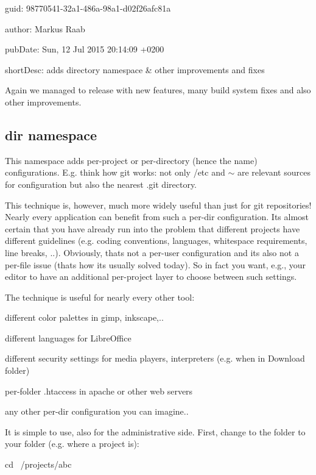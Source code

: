 
\begin{DoxyItemize}
\item guid\+: 98770541-\/32a1-\/486a-\/98a1-\/d02f26afc81a
\item author\+: Markus Raab
\item pub\+Date\+: Sun, 12 Jul 2015 20\+:14\+:09 +0200
\item short\+Desc\+: adds directory namespace \& other improvements and fixes
\end{DoxyItemize}

Again we managed to release with new features, many build system fixes and also other improvements.

\subsection*{dir namespace}

This namespace adds per-\/project or per-\/directory (hence the name) configurations. E.\+g. think how git works\+: not only /etc and $\sim$ are relevant sources for configuration but also the nearest .git directory.

This technique is, however, much more widely useful than just for git repositories! Nearly every application can benefit from such a per-\/dir configuration. Its almost certain that you have already run into the problem that different projects have different guidelines (e.\+g. coding conventions, languages, whitespace requirements, line breaks, ..). Obviously, thats not a per-\/user configuration and its also not a per-\/file issue (thats how its usually solved today). So in fact you want, e.\+g., your editor to have an additional per-\/project layer to choose between such settings.

The technique is useful for nearly every other tool\+:


\begin{DoxyItemize}
\item different color palettes in gimp, inkscape,..
\item different languages for Libre\+Office
\item different security settings for media players, interpreters (e.\+g. when in Download folder)
\item per-\/folder .htaccess in apache or other web servers
\item any other per-\/dir configuration you can imagine..
\end{DoxyItemize}

It is simple to use, also for the administrative side. First, change to the folder to your folder (e.\+g. where a project is)\+: \begin{DoxyVerb}cd ~/projects/abc
\end{DoxyVerb}


